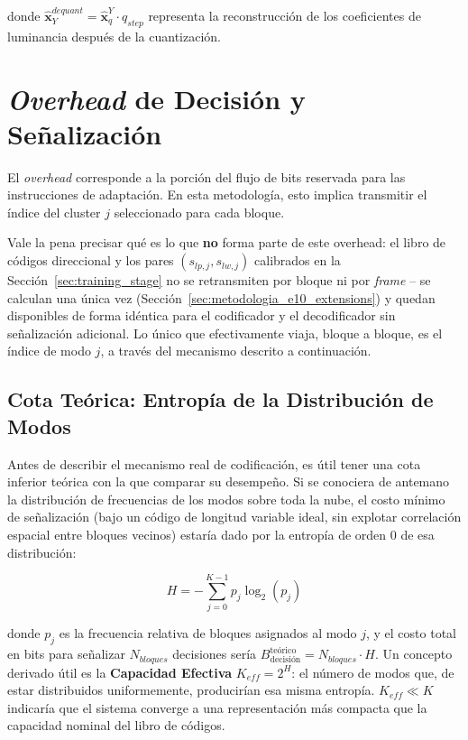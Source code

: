    donde $\hat{\mathbf{x}}_Y^{dequant} = \hat{\mathbf{x}}_q^{Y} \cdot q_{step}$ representa la reconstrucción de los coeficientes de luminancia después de la cuantización.

\section{\textit{Overhead} de Decisión y Señalización}\label{sec:overhead_method}

El \textit{overhead} corresponde a la porción del flujo de bits reservada para las instrucciones de adaptación. En esta metodología, esto implica transmitir el índice del cluster $j$ seleccionado para cada bloque.

Vale la pena precisar qué es lo que \textbf{no} forma parte de este overhead: el libro de
códigos direccional y los pares $(s_{lp,j}, s_{lw,j})$ calibrados en la
Sección~\ref{sec:training_stage} no se retransmiten por bloque ni por \textit{frame} -- se
calculan una única vez (Sección~\ref{sec:metodologia_e10_extensions}) y quedan disponibles de
forma idéntica para el codificador y el decodificador sin señalización adicional. Lo único que
efectivamente viaja, bloque a bloque, es el índice de modo $j$, a través del mecanismo descrito
a continuación.

\subsection{Cota Teórica: Entropía de la Distribución de Modos}

Antes de describir el mecanismo real de codificación, es útil tener una cota inferior teórica
con la que comparar su desempeño. Si se conociera de antemano la distribución de frecuencias de
los modos sobre toda la nube, el costo mínimo de señalización (bajo un código de longitud
variable ideal, sin explotar correlación espacial entre bloques vecinos) estaría dado por la
entropía de orden 0 de esa distribución:

\begin{equation}
    H = -\sum_{j=0}^{K-1} p_j \log_2(p_j)
\end{equation}

donde $p_j$ es la frecuencia relativa de bloques asignados al modo $j$, y el costo total en bits
para señalizar $N_{bloques}$ decisiones sería $B_{\text{decisión}}^{\text{teórico}} =
N_{bloques} \cdot H$. Un concepto derivado útil es la \textbf{Capacidad Efectiva} $K_{eff} =
2^H$: el número de modos que, de estar distribuidos uniformemente, producirían esa misma
entropía. $K_{eff} \ll K$ indicaría que el sistema converge a una representación más compacta
que la capacidad nominal del libro de códigos.

